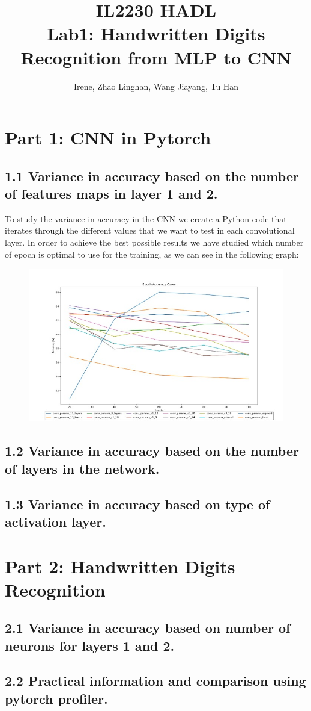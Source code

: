 \documentclass{article}
\title{IL2230 HADL \\ Lab1: Handwritten Digits Recognition from MLP to CNN}
\author{Irene, Zhao Linghan, Wang Jiayang, Tu Han}
\begin{document}
\maketitle %

\section*{Part 1: CNN in Pytorch}
\subsection*{1.1 Variance in accuracy based on the number of features maps in layer 1 and 2.}
To study the variance in accuracy in the CNN we create a Python code that iterates through the different values that we want to test in each convolutional layer. In order to achieve the best possible results we have studied which number of epoch is optimal to use for the training, as we can see in the following graph: \\
\begin{figure}[h]
    \centering
    \includegraphics[width=15cm]{Epoch_Accuracy.jpg}
    \label{fig:my_label}
\end{figure}
\subsection*{1.2 Variance in accuracy based on the number of layers in the network.}

\subsection*{1.3 Variance in accuracy based on type of activation layer.}

\section*{Part 2: Handwritten Digits Recognition}
\subsection*{2.1 Variance in accuracy based on number of neurons for layers 1 and 2.}
\subsection*{2.2 Practical information and comparison using pytorch profiler.}
\end{document}
